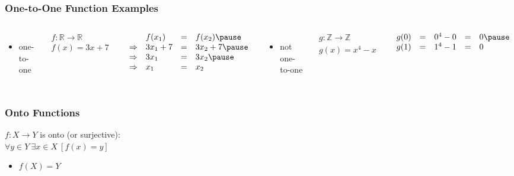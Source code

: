 \documentclass[dvipsnames]{beamer}
\begin{document}
\begin{frame}
  \frametitle{One-to-One Function Examples}

  \begin{columns}[t]
    \begin{itemize}
     \item one-to-one
    \end{itemize}

    \medskip
    $\begin{array}{l}
      f: \mathbb{R} \rightarrow \mathbb{R}\\
      f(x) = 3x + 7
    \end{array}$

    \pause
    \bigskip
    $\begin{array}{llll}
                  & f(x_1)    & = & f(x_2)\pause\\
      \Rightarrow & 3 x_1 + 7 & = & 3 x_2 + 7\pause\\
      \Rightarrow & 3 x_1     & = & 3 x_2\pause\\
      \Rightarrow & x_1       & = & x_2
    \end{array}$

    \pause
    \begin{itemize}
     \item not one-to-one
    \end{itemize}

    \medskip
    $\begin{array}{l}
      g: \mathbb{Z} \rightarrow \mathbb{Z}\\
      g(x) = x^4 - x
    \end{array}$

    \pause
    \bigskip
    $\begin{array}{lllll}
      g(0) & = & 0^4 - 0 & = & 0\pause\\
      g(1) & = & 1^4 - 1 & = & 0
    \end{array}$
  \end{columns}
\end{frame}

\begin{frame}
  \frametitle{Onto Functions}

  \begin{definition}
    $f: X \rightarrow Y$ is \alert{onto} (or \alert{surjective}):\\
    $\forall y \in Y~\exists x \in X~[f(x)=y]$
  \end{definition}

  \begin{itemize}
    \item $f(X)=Y$
  \end{itemize}
\end{frame}
\end{document}
